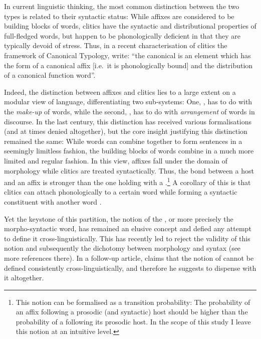 In current linguistic thinking, the most common distinction between the two types is related to their syntactic status:  While affixes are considered to be building blocks of words, clitics have the syntactic and distributional properties of full-fledged words, but happen to be phonologically deficient in that they are typically devoid of stress.
  Thus, in a recent characterisation of clitics the framework of Canonical Typology, \citet[140]{SpencerLuisCanonical} write: \enquote{the canonical  is an element which has the form of a canonical affix [i.e.\ it is phonologically bound] and the distribution of a canonical function word}. 

Indeed, the distinction between affixes and clitics lies to a large extent on a modular view of language, differentiating two sub-systems: One, , has to do with the \textit{make-up} of {words}, while the second, , has to do with \textit{arrangement} of words in discourse. In the last century, this distinction has received various formalisations (and at times denied altogether), but the core insight justifying this distinction remained the same: While words can combine together to form sentences in a seemingly limitless fashion, the building blocks of words  combine in a much more limited and regular fashion. In this view, affixes fall under the domain of morphology while clitics are treated syntactically. Thus, the bond between a host and an affix is stronger than the one holding with a .\footnote{This notion can be formalised as a transition probability: The probability of an affix following a prosodic (and syntactic) host should be higher than the probability of a  following its prosodic host. In the scope of this study I leave this notion at an intuitive level.} A corollary of this is that clitics can attach phonologically to a certain word while forming a syntactic constituent with another word \citep[cf.][]{Klavans}.

\largerpage
Yet the keystone of this partition, the notion of the , or more precisely the morpho-syntactic word, has remained an elusive concept and defied any attempt to define it  cross-linguistically. This has recently led \citet{HaspelmathWord} to reject the validity of this notion and subsequently the dichotomy between morphology and syntax (see more references there). In a follow-up article, \citet{HaspelmathClitics} claims that the notion of  cannot be defined consistently cross-linguistically, and therefore he suggests to dispense with it altogether.

